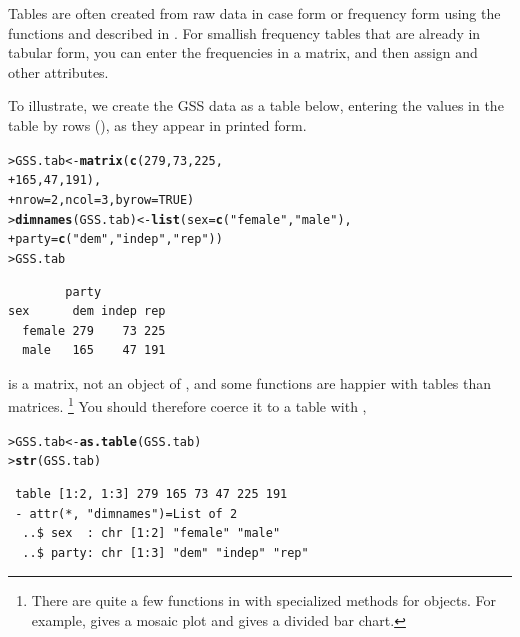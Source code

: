\documentclass[10pt,krantz2]{krantz}\usepackage[]{graphicx}\usepackage[]{color}
\makeatletter
\newcommand{\hlnum}[1]{\textcolor[rgb]{0.686,0.059,0.569}{#1}}%
\newcommand{\hlstr}[1]{\textcolor[rgb]{0.192,0.494,0.8}{#1}}%
\newcommand{\hlstd}[1]{\textcolor[rgb]{0.345,0.345,0.345}{#1}}%
\newcommand{\hlkwb}[1]{\textcolor[rgb]{0.69,0.353,0.396}{#1}}%
\newcommand{\hlkwc}[1]{\textcolor[rgb]{0.333,0.667,0.333}{#1}}%
\newcommand{\hlkwd}[1]{\textcolor[rgb]{0.737,0.353,0.396}{\textbf{#1}}}%
\newenvironment{kframe}{%
 \def\at@end@of@kframe{}%
 \ifinner\ifhmode%
  \def\at@end@of@kframe{\end{minipage}}%
  \begin{minipage}{\columnwidth}%
 \fi\fi%
 \def\FrameCommand##1{\hskip\@totalleftmargin \hskip-\fboxsep
 \colorbox{shadecolor}{##1}\hskip-\fboxsep
     \hskip-\linewidth \hskip-\@totalleftmargin \hskip\columnwidth}%
 \MakeFramed {\advance\hsize-\width
   \@totalleftmargin\z@ \linewidth\hsize
   \@setminipage}}%
 {\par\unskip\endMakeFramed%
 \at@end@of@kframe}
\newenvironment{knitrout}{}{} %
\renewenvironment{knitrout}{\small\renewcommand{\baselinestretch}{.85}}{} %
\makeatother
\begin{document}
Tables are often created from raw data in case form or frequency form using the
functions  and  described in .
For smallish frequency tables that are already in tabular form, you can enter
the frequencies in a matrix, and then assign  and other attributes.

To illustrate, we create the GSS data as a table below, entering the
values in the table by rows (), as they appear in
printed form.

\begin{knitrout}
\color{fgcolor}\begin{kframe}
\begin{alltt}
\hlstd{> }\hlstd{GSS.tab} \hlkwb{<-} \hlkwd{matrix}\hlstd{(}\hlkwd{c}\hlstd{(}\hlnum{279}\hlstd{,} \hlnum{73}\hlstd{,} \hlnum{225}\hlstd{,}
\hlstd{+ }                    \hlnum{165}\hlstd{,} \hlnum{47}\hlstd{,} \hlnum{191}\hlstd{),}
\hlstd{+ }                  \hlkwc{nrow} \hlstd{=} \hlnum{2}\hlstd{,} \hlkwc{ncol} \hlstd{=} \hlnum{3}\hlstd{,} \hlkwc{byrow} \hlstd{=} \hlnum{TRUE}\hlstd{)}
\hlstd{> }\hlkwd{dimnames}\hlstd{(GSS.tab)} \hlkwb{<-} \hlkwd{list}\hlstd{(}\hlkwc{sex} \hlstd{=} \hlkwd{c}\hlstd{(}\hlstr{"female"}\hlstd{,} \hlstr{"male"}\hlstd{),}
\hlstd{+ }                          \hlkwc{party} \hlstd{=} \hlkwd{c}\hlstd{(}\hlstr{"dem"}\hlstd{,} \hlstr{"indep"}\hlstd{,} \hlstr{"rep"}\hlstd{))}
\hlstd{> }\hlstd{GSS.tab}
\end{alltt}
\begin{verbatim}
        party
sex      dem indep rep
  female 279    73 225
  male   165    47 191
\end{verbatim}
\end{kframe}
\end{knitrout}
 is a matrix, not an object of , and some functions
are happier with tables than matrices.%
\footnote{
There are quite a few functions in \R with specialized methods for
 objects. For example,  gives a mosaic
plot and  gives a divided bar chart.
}
You should therefore coerce it to a table with ,
\begin{knitrout}
\color{fgcolor}\begin{kframe}
\begin{alltt}
\hlstd{> }\hlstd{GSS.tab} \hlkwb{<-} \hlkwd{as.table}\hlstd{(GSS.tab)}
\hlstd{> }\hlkwd{str}\hlstd{(GSS.tab)}
\end{alltt}
\begin{verbatim}
 table [1:2, 1:3] 279 165 73 47 225 191
 - attr(*, "dimnames")=List of 2
  ..$ sex  : chr [1:2] "female" "male"
  ..$ party: chr [1:3] "dem" "indep" "rep"
\end{verbatim}
\end{kframe}
\end{knitrout}
\end{document}
